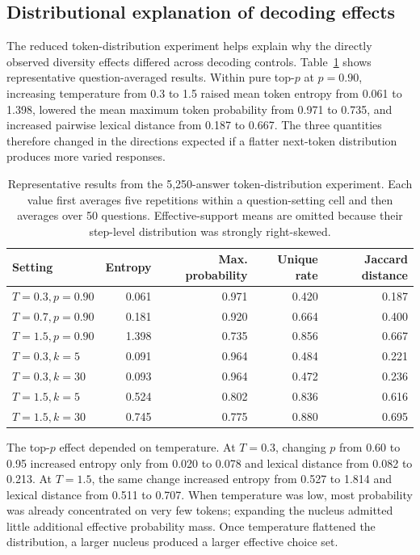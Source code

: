 \documentclass[11pt]{article}
\begin{document}
\subsection{Distributional explanation of decoding effects}

The reduced token-distribution experiment helps explain why the directly observed diversity
effects differed across decoding controls. Table~\ref{tab:mechanism-examples}
shows representative question-averaged results. Within pure top-$p$ at
$p=0.90$, increasing temperature from 0.3 to 1.5 raised mean token entropy
from 0.061 to 1.398, lowered the mean maximum token probability from 0.971 to
0.735, and increased pairwise lexical distance from 0.187 to 0.667. The three
quantities therefore changed in the directions expected if a flatter
next-token distribution produces more varied responses.

\begin{table}[ht]
\centering
\small
\caption{Representative results from the 5,250-answer token-distribution experiment.
Each value first averages five repetitions within a question-setting cell and
then averages over 50 questions. Effective-support means are omitted because
their step-level distribution was strongly right-skewed.}
\label{tab:mechanism-examples}
\begin{tabular}{@{}lrrrr@{}}
\toprule
Setting & Entropy & Max. probability & Unique rate & Jaccard distance \\
\midrule
$T=0.3,p=0.90$ & 0.061 & 0.971 & 0.420 & 0.187 \\
$T=0.7,p=0.90$ & 0.181 & 0.920 & 0.664 & 0.400 \\
$T=1.5,p=0.90$ & 1.398 & 0.735 & 0.856 & 0.667 \\
\midrule
$T=0.3,k=5$  & 0.091 & 0.964 & 0.484 & 0.221 \\
$T=0.3,k=30$ & 0.093 & 0.964 & 0.472 & 0.236 \\
$T=1.5,k=5$  & 0.524 & 0.802 & 0.836 & 0.616 \\
$T=1.5,k=30$ & 0.745 & 0.775 & 0.880 & 0.695 \\
\bottomrule
\end{tabular}
\end{table}

The top-$p$ effect depended on temperature. At $T=0.3$, changing $p$ from
0.60 to 0.95 increased entropy only from 0.020 to 0.078 and lexical distance
from 0.082 to 0.213. At $T=1.5$, the same change increased entropy from 0.527
to 1.814 and lexical distance from 0.511 to 0.707. When temperature was low,
most probability was already concentrated on very few tokens; expanding the
nucleus admitted little additional effective probability mass. Once
temperature flattened the distribution, a larger nucleus produced a larger
effective choice set.
\end{document}
